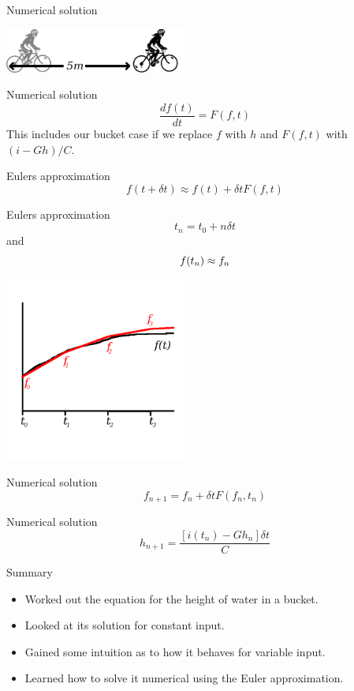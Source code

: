 \documentclass{beamer}
\newcommand{\crish}{\color{reddish}}
\newcommand{\cbla}{\color{black}}
\newcommand{\cred}{\color{red}}
\begin{document}
\begin{frame}{Numerical solution}
  \begin{center}
    \includegraphics[width=6cm]{cyclist2.png}
  \end{center}
  \end{frame}

\begin{frame}{Numerical solution}
\crish
  $$
\frac{df(t)}{dt}=F(f,t)
$$
\cbla{}This includes our bucket case if we replace \crish$f$\cbla{} with \crish$h$\cbla{} and \crish$F(f,t)$\cbla{}
with \crish$(i-Gh)/C$\cbla.
\end{frame}

\begin{frame}{Eulers approximation}
  \crish
  $$
  f(t+\delta t)\approx f(t)+\delta t F(f,t)
  $$
\cbla
\end{frame}


\begin{frame}{Eulers approximation}
\crish
  $$
t_n=t_0+n\delta t
$$
\cbla
and\crish
$$f(t_n)\approx \cred{}f_n$$
\cbla
  \begin{center}
    \includegraphics[width=6cm]{f.png}
  \end{center}
\end{frame}

\begin{frame}{Numerical solution}
\crish
$$f_{n+1}=f_n+\delta t F(f_n,t_n)$$
\cbla
  \end{frame}


\begin{frame}{Numerical solution}
\crish
$$
h_{n+1}=\frac{[i(t_n)-Gh_n]\delta t}{C}
$$
\cbla
  \end{frame}

\begin{frame}{Summary}
  \begin{itemize}
  \item Worked out the equation for the height of water in a bucket.
  \item Looked at its solution for constant input.
  \item Gained some intuition as to how it behaves for variable input.
  \item Learned how to solve it numerical using the Euler approximation.
  \end{itemize}
\end{frame}
\end{document}
